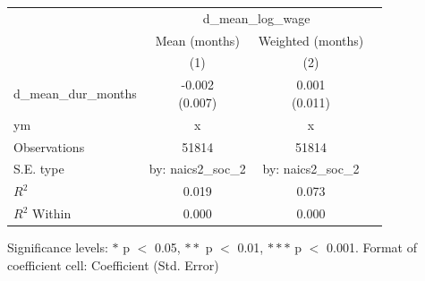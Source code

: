 \renewcommand\cellalign{t}
\begin{threeparttable}
\begin{tabular}{lccc}
\toprule
 & \multicolumn{2}{c}{d_mean_log_wage} \\
\cmidrule(lr){2-3} 
 & Mean (months) & Weighted (months) \\
 & (1) & (2) \\
\midrule
\addlinespace
d_mean_dur_months & \makecell{-0.002 \\ (0.007)} & \makecell{0.001 \\ (0.011)} \\
\midrule
\addlinespace
ym & x & x \\
\midrule
\addlinespace
Observations & 51814 & 51814 \\
S.E. type & by: naics2_soc_2 & by: naics2_soc_2 \\
$R^2$ & 0.019 & 0.073 \\
$R^2$ Within & 0.000 & 0.000 \\
\bottomrule
\end{tabular}
\footnotesize Significance levels: $*$ p $<$ 0.05, $**$ p $<$ 0.01, $***$ p $<$ 0.001. Format of coefficient cell: Coefficient 
 (Std. Error)
\end{threeparttable}